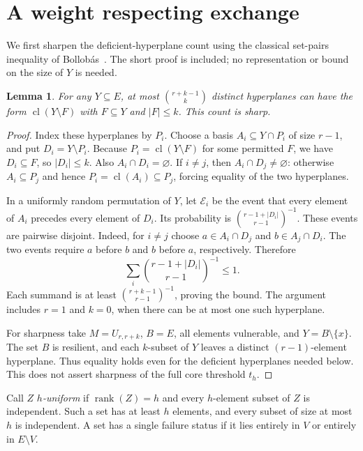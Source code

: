 \documentclass[11pt]{article}
\newtheorem{lemma}[theorem]{Lemma}
\theoremstyle{definition}\newtheorem{definition}[theorem]{Definition}
\theoremstyle{remark}\newtheorem{remark}[theorem]{Remark}
\DeclareMathOperator{\rk}{rank}
\DeclareMathOperator{\cl}{cl}
\begin{document}
\section{A weight respecting exchange}
We first sharpen the deficient-hyperplane count using the classical set-pairs inequality of Bollob\'as~\cite{Bollobas}. The short proof is included; no representation or bound on the size of $Y$ is needed.

\begin{lemma}\label{lem:hyperplanes}
For any $Y\subseteq E$, at most $\binom{r+k-1}{k}$ distinct hyperplanes can have the form $\cl(Y\setminus F)$ with $F\subseteq Y$ and $|F|\leq k$. This count is sharp.
\end{lemma}
\begin{proof}
Index these hyperplanes by $P_i$. Choose a basis $A_i\subseteq Y\cap P_i$ of size $r-1$, and put $D_i=Y\setminus P_i$. Because $P_i=\cl(Y\setminus F)$ for some permitted $F$, we have $D_i\subseteq F$, so $|D_i|\leq k$. Also $A_i\cap D_i=\varnothing$. If $i\ne j$, then $A_i\cap D_j\ne\varnothing$: otherwise $A_i\subseteq P_j$ and hence $P_i=\cl(A_i)\subseteq P_j$, forcing equality of the two hyperplanes.

In a uniformly random permutation of $Y$, let $\mathcal E_i$ be the event that every element of $A_i$ precedes every element of $D_i$. Its probability is $\binom{r-1+|D_i|}{r-1}^{-1}$. These events are pairwise disjoint. Indeed, for $i\ne j$ choose $a\in A_i\cap D_j$ and $b\in A_j\cap D_i$. The two events require $a$ before $b$ and $b$ before $a$, respectively. Therefore
\[
 \sum_i\binom{r-1+|D_i|}{r-1}^{-1}\leq1.
\]
Each summand is at least $\binom{r+k-1}{r-1}^{-1}$, proving the bound. The argument includes $r=1$ and $k=0$, when there can be at most one such hyperplane.

For sharpness take $M=U_{r,r+k}$, $B=E$, all elements vulnerable, and $Y=B\setminus\{x\}$. The set $B$ is resilient, and each $k$-subset of $Y$ leaves a distinct $(r-1)$-element hyperplane. Thus equality holds even for the deficient hyperplanes needed below. This does not assert sharpness of the full core threshold $t_h$.
\end{proof}

Call $Z$ \emph{$h$-uniform} if $\rk(Z)=h$ and every $h$-element subset of $Z$ is independent. Such a set has at least $h$ elements, and every subset of size at most $h$ is independent. A set has a single failure status if it lies entirely in $V$ or entirely in $E\setminus V$.
\end{document}
